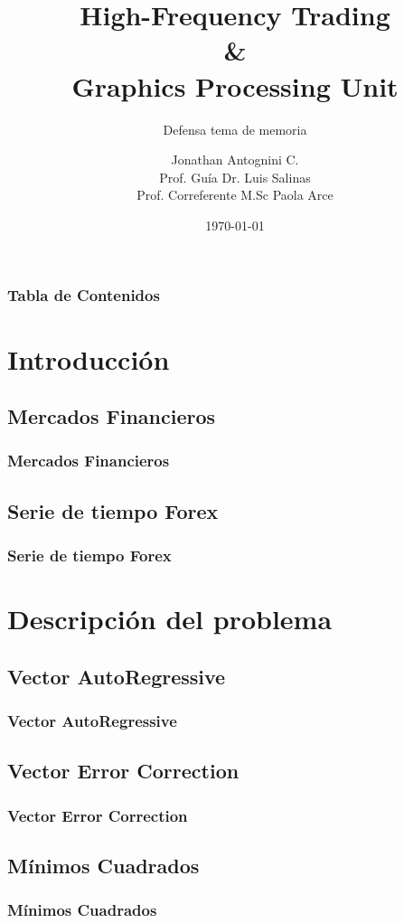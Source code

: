\documentclass{beamer}
\title{High-Frequency Trading \\ \& \\ Graphics Processing Unit}
\subtitle{Defensa tema de memoria}
\author{Jonathan Antognini C.\\
		Prof. Guía Dr. Luis Salinas\\
        Prof. Correferente M.Sc Paola Arce}
\institute[UTFSM]{Universidad Técnica Federico Santa María}
\date{\today}
\begin{document}
    \frame{\titlepage}
    \begin{frame}{\contentsname}
        \frametitle{Tabla de Contenidos} 
        \begin{multicols}{2}
        \tableofcontents
        \end{multicols}
    \end{frame}
	
    \section{Introducción}
        \subsection{Mercados Financieros}
            \begin{frame}
            \frametitle{Mercados Financieros} 
            \end{frame}
        \subsection{Serie de tiempo Forex}
            \begin{frame}
            \frametitle{Serie de tiempo Forex}
            \end{frame}
    \section{Descripción del problema}
        \subsection{Vector AutoRegressive}
            \begin{frame}
            \frametitle{Vector AutoRegressive} 
            \end{frame}
        \subsection{Vector Error Correction}
            \begin{frame}
            \frametitle{Vector Error Correction} 
            \end{frame}
        \subsection{Mínimos Cuadrados}
            \begin{frame}
            \frametitle{Mínimos Cuadrados}
            \end{frame}
\end{document}
